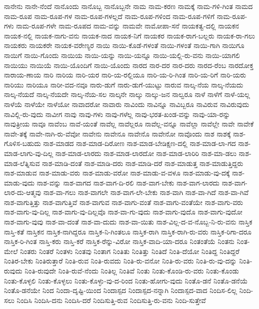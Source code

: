 {ನಾನೇನು
ನಾನೇ-ನೆಂದೆ
ನಾನೊಂದು
ನಾನೊಬ್ಬ
ನಾನೊಬ್ಬನೇ
ನಾಮ
ನಾಮ-ಕರಣ
ನಾಮಕ್ಕೆ
ನಾಮ-ಗಳಿ-ಗಿಂತ
ನಾಮದ
ನಾಮ-ರೂಪ
ನಾಮ-ರೂಪ-ಗಳ
ನಾಮ-ರೂಪ-ಗಳಲ್ಲದೆ
ನಾಮ-ರೂಪ-ಗಳಿಂದ
ನಾಮ-ರೂಪ-ಗಳಿಗೆ
ನಾಮ-ರೂಪ-ಗಳು
ನಾಮ-ರೂಪ-ಗಳೇ
ನಾಮ-ರೂಪದ
ನಾಮ-ವನ್ನು
ನಾಮವೇ
ನಾಮೋಪಾ-ಸನೆ
ನಾಯಕತ್ವ-ದಲ್ಲಿ
ನಾಯಕನ
ನಾಯಕ-ನಲ್ಲಿ
ನಾಯಕ-ನಾಗು-ವನು
ನಾಯಕ-ನಾದ
ನಾಯಕ-ನಿಗೆ
ನಾಯಕರ
ನಾಯಕ-ರಾಗ-ಬಲ್ಲರು
ನಾಯಕ-ರಾ-ಗಲು
ನಾಯಕರು
ನಾಯಕರೇ
ನಾಯಕ-ವರೇಣ್ಯರ
ನಾಯಿ
ನಾಯಿ-ಕೊಡೆ-ಗಳಂತೆ
ನಾಯಿ-ಗಳಂತೆ
ನಾಯಿ-ಗಾಗಿ
ನಾಯಿಗೂ
ನಾಯಿಗೆ
ನಾಯಿ-ಗೊಂದು
ನಾಯಿಯ
ನಾಯಿ-ಯನ್ನು
ನಾಯಿ-ಯನ್ನೂ
ನಾಯಿ-ಯಲ್ಲಿ-ರು-ವನು
ನಾಯಿ-ಯಾಗಲಿ
ನಾಯಿಯು
ನಾಯಿಯೆ
ನಾಯಿ-ಯೊಂದಿಗೆ
ನಾಯಿ-ಯೊಂದು
ನಾರದ
ನಾರ-ದರ
ನಾರ-ದರು
ನಾರದ-ರೆಂಬ
ನಾರದೋಕ್ತ
ನಾರಾಯ-ಣಾಯ
ನಾರಿ
ನಾರಿಯ
ನಾರಿ-ಯರ
ನಾರಿ-ಯ-ರಲ್ಲಿಯೂ
ನಾರಿ-ಯ-ರಿ-ಗಿಂತ
ನಾರಿ-ಯ-ರಿಗೆ
ನಾರಿ-ಯರು
ನಾರಿಯು
ನಾರಿಯೂ
ನಾರೀ-ವದ-ನವೂ
ನಾರು-ಡುಗೆ
ನಾರು-ಡುಗೆ-ಯುಟ್ಟು
ನಾರುವ
ನಾಲ್ಕ-ನೆಯ
ನಾಲ್ಕ-ನೆಯದು
ನಾಲ್ಕ-ನೆಯದೆ
ನಾಲ್ಕ-ನೆಯದೇ
ನಾಲ್ಕ-ನೆಯ-ಸಲ
ನಾಲ್ಕನೇ
ನಾಲ್ಕು
ನಾಲ್ಕು-ಜನ
ನಾಲ್ವರೂ
ನಾಳೆ
ನಾಳೆಗೆ
ನಾಳೆ-ಯಲ್ಲ
ನಾಳೆಯೆ
ನಾಳೆಯೇ
ನಾಳೆಯೋ
ನಾವಾದರೋ
ನಾವಾರು
ನಾವಿಂದು
ನಾವಿನ್ನೂ
ನಾವಿಬ್ಬರೂ
ನಾವಿರುವ
ನಾವಿರುವುದು
ನಾವಿಲ್ಲಿ-ರು-ವುದು
ನಾವೀಗ
ನಾವು
ನಾವು-ಗಳು
ನಾವು-ಗಳೆಲ್ಲ
ನಾವು-ಭರತ-ಖಂಡ-ವನ್ನು
ನಾವು-ಯಾ-ರನ್ನು
ನಾವುತ್ರೀಯ
ನಾವೂ
ನಾವೆಂಬ
ನಾವೆ-ಯಂತೆ
ನಾವೆಲ್ಲ
ನಾವೆಲ್ಲರೂ
ನಾವೆಲ್ಲ-ವನ್ನೂ
ನಾವೆಲ್ಲಾ
ನಾವೆಲ್ಲೇ
ನಾವೇ
ನಾವೇಕೆ
ನಾವೇ-ತಕ್ಕೆ
ನಾವೇ-ನಾಗಿ-ರು-ವೆವೋ
ನಾವೇನು
ನಾವೇನೂ
ನಾವೇನೊ
ನಾವೇನೋ
ನಾವೊಂದು
ನಾಶ
ನಾಶಕ್ಕೆ
ನಾಶ-ಗೊಳಿಸ-ಬಹುದು
ನಾಶ-ಮಾಡದ
ನಾಶ-ಮಾಡ-ದಿರೋಣ
ನಾಶ-ಮಾಡ-ಬೇಡಿಕ್ಷಣ-ದಲ್ಲಿ
ನಾಶ-ಮಾಡ-ಲಾ-ಗದ
ನಾಶ-ಮಾಡ-ಲಾಗು-ವು-ದಿಲ್ಲ
ನಾಶ-ಮಾಡ-ಲಾರದು
ನಾಶ-ಮಾಡ-ಲಾರದೋ
ನಾಶ-ಮಾಡ-ಲಾರಿರಿ
ನಾಶ-ಮಾ-ಡಲು
ನಾಶ-ಮಾಡ-ಲೆತ್ನಿಸುವ
ನಾಶ-ಮಾಡಿ-ದಂತೆ
ನಾಶ-ಮಾಡಿ-ದರು
ನಾಶ-ಮಾಡಿ-ದರೆ
ನಾಶ-ಮಾಡುತ್ತ
ನಾಶ-ಮಾಡುತ್ತಿದ್ದರು
ನಾಶ-ಮಾಡುವ
ನಾಶ-ಮಾಡು-ವರು
ನಾಶ-ಮಾಡು-ವರೋ
ನಾಶ-ಮಾಡು-ವ-ವಳೂ
ನಾಶ-ಮಾಡು-ವು-ದಕ್ಕೆ
ನಾಶ-ಮಾಡು-ವುದು
ನಾಶ-ವನ್ನು
ನಾಶ-ವಾಗದ
ನಾಶ-ವಾಗ-ದಿ-ರಲಿ
ನಾಶ-ವಾಗ-ಬೇಕು
ನಾಶ-ವಾಗ-ಲಾರದು
ನಾಶ-ವಾಗ-ಲಾರ-ದು-ಆತ್ಮವು
ನಾಶ-ವಾ-ಗಲು
ನಾಶ-ವಾಗಲೇ
ನಾಶ-ವಾಗ-ಲೇ-ಬೇಕು
ನಾಶ-ವಾಗಿ
ನಾಶ-ವಾ-ಗಿದೆ
ನಾಶ-ವಾ-ಗಿವೆ
ನಾಶ-ವಾಗುತ್ತಿತ್ತು
ನಾಶ-ವಾಗುತ್ತಿವೆ
ನಾಶ-ವಾಗುವ
ನಾಶ-ವಾಗು-ವಂತೆ
ನಾಶ-ವಾಗು-ವಂತೆಯೇ
ನಾಶ-ವಾಗು-ವರು
ನಾಶ-ವಾಗು-ವು-ದಿಲ್ಲ
ನಾಶ-ವಾಗು-ವು-ದಿಲ್ಲವೊ
ನಾಶ-ವಾ-ಗು-ವುದು
ನಾಶ-ವಾಗು-ವುದೊ
ನಾಶ-ವಾಗು-ವುದೋ
ನಾಶ-ವಾಗು-ವುವು
ನಾಶ-ವಾ-ದಂತೆ
ನಾಶ-ವಾ-ದುದು
ನಾಶ-ವಾ-ಯಿತು
ನಾಶ-ವಿಲ್ಲ-ದ-ವ-ನೊಬ್ಬ-ನಿ-ರು-ವನು
ನಾಸ್ತಿಕ
ನಾಸ್ತಿ-ಕತೆ
ನಾಸ್ತಿಕನ
ನಾಸ್ತಿಕ-ನಾಗಿದ್ದರೂ
ನಾಸ್ತಿಕ-ನಿ-ಗಿಂತಲೂ
ನಾಸ್ತಿಕ-ರಾಗಿ
ನಾಸ್ತಿಕ-ರಾಗಿ-ರು-ವರು
ನಾಸ್ತಿಕ-ರಿಗಾ-ದರೂ
ನಾಸ್ತಿಕ-ರಿ-ಗಿಂತ
ನಾಸ್ತಿ-ಕರು
ನಾಸ್ತಿ-ಕರೆ
ನಾಸ್ತಿಕ-ರೆನ್ನು-ವಿರೋ
ನಾಸ್ತಿಕ-ವಾದಿ-ಯಾ-ದರೂ
ನಿಂತಂತೆಯೆ
ನಿಂತನು
ನಿಂತ-ಮೇಲೆ
ನಿಂತರು
ನಿಂತರೆ
ನಿಂತಳು
ನಿಂತವು
ನಿಂತಾಗ
ನಿಂತಿತು
ನಿಂತಿತ್ತು
ನಿಂತಿದೆ
ನಿಂತಿ-ದೆಯೋ
ನಿಂತಿದ್ದ
ನಿಂತಿದ್ದರೆ
ನಿಂತಿರ-ಬೇಕು
ನಿಂತಿರುತ್ತಾರೆ
ನಿಂತಿ-ರುವ
ನಿಂತಿ-ರುವದು
ನಿಂತಿ-ರು-ವನೋ
ನಿಂತಿ-ರು-ವರು
ನಿಂತಿ-ರು-ವು-ದನ್ನು
ನಿಂತಿ-ರುವುದು
ನಿಂತಿ-ರುವುದೇ
ನಿಂತಿ-ರುವೆ-ನೆಂದು
ನಿಂತಿಲ್ಲ
ನಿಂತಿವೆ
ನಿಂತು
ನಿಂತು-ಕೊಂಡಿ-ರು-ವರು
ನಿಂತು-ಕೊಂಡು
ನಿಂತು-ಕೊಳ್ಳಲಿ
ನಿಂತು-ಕೊಳ್ಳಲು
ನಿಂತು-ಕೊಳ್ಳು-ವು-ದ-ರಿಂದ
ನಿಂತು-ಹೋಗು-ವುದು
ನಿಂತೊ-ಡನೆ
ನಿಂತೊ-ಡನೆಯೆ
ನಿಂತೊ-ಡನೆಯೇ
ನಿಂದ
ನಿಂದಾ-ದೃಷ್ಟಿ-ಯಿಂದ
ನಿಂದಾಸ್ಪದ
ನಿಂದಾಸ್ಪದ-ನನ್ನಾಗಿ
ನಿಂದಾಸ್ಪದ-ವಾದ
ನಿಂದಿಸ-ಲಿಲ್ಲ
ನಿಂದಿ-ಸಲು
ನಿಂದಿಸಿ
ನಿಂದಿಸಿ-ದನು
ನಿಂದಿಸಿ-ದರೆ
ನಿಂದಿಸುತ್ತಿ-ರುವ
ನಿಂದಿಸುತ್ತಿ-ರು-ವನು
ನಿಂದಿ-ಸುತ್ತೇವೆ
}
